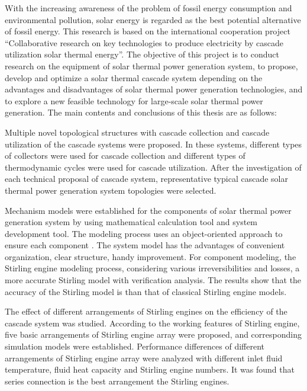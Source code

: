 \enabstract
{
With the increasing awareness of the problem of fossil energy consumption and environmental pollution, solar energy is regarded as the best potential alternative of fossil energy. This research is based on the international cooperation project ``Collaborative research on key technologies to produce electricity by cascade utilization solar thermal energy''. The objective of this project is to conduct research on the equipment of solar thermal power generation system, to propose, develop and optimize a solar thermal cascade system depending on the advantages and disadvantages of solar thermal power generation technologies, and to explore a new feasible technology for large-scale solar thermal power generation. The main contents and conclusions of this thesis are as follows:

Multiple novel topological structures with cascade collection and cascade utilization of the cascade systems were proposed. In these systems, different types of collectors were used for cascade collection and different types of thermodynamic cycles were used for cascade utilization. After the investigation of each technical proposal of cascade system, representative typical cascade solar thermal power generation system topologies were selected.

Mechanism models were established for the components of solar thermal power generation system by using mathematical calculation tool and system development tool. The modeling process uses an object-oriented approach to ensure {\color{red}} each component {}. The system model has the advantages of convenient organization, clear structure, handy improvement. For component modeling, the Stirling engine modeling process, considering various irreversibilities and losses, {} a more accurate Stirling model with verification analysis. The results show that the accuracy of the {} Stirling model is {} than that of classical Stirling engine models.

The effect of different arrangements of Stirling engines on the efficiency of the cascade system was studied. 
According to the working features of Stirling engine, five basic arrangements of Stirling engine array were proposed, and corresponding simulation models were established.
Performance differences of different arrangements of Stirling engine array were analyzed with different inlet fluid temperature, fluid heat capacity and Stirling engine numbers.
It was found that series connection is the best arrangement {} the Stirling engines.

}
